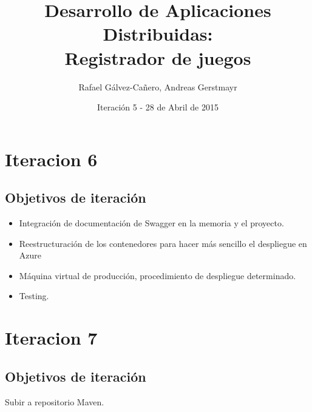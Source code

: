 \documentclass[12pt,a4paper]{report}
\title{Desarrollo de Aplicaciones Distribuidas: \\ Registrador de juegos}
\author{Rafael Gálvez-Cañero, Andreas Gerstmayr}
\date{Iteración 5 - 28 de Abril de 2015} %
\begin{document}
\maketitle
\tableofcontents
\listoffigures
\listoftables











 
\chapter{Iteracion 6}
\section{Objetivos de iteración}
\begin{itemize}
 \item Integración de documentación de Swagger en la memoria y el proyecto.
 \item Reestructuración de los contenedores para hacer más sencillo el despliegue en Azure
 \item Máquina virtual de producción, procedimiento de despliegue determinado.
 \item Testing.
\end{itemize}

\chapter{Iteracion 7}
\section{Objetivos de iteración}
Subir a repositorio Maven.
\end{document}
